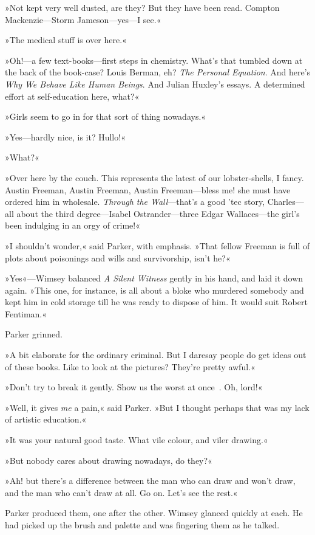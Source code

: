 »Not kept very well dusted, are they? But they have been read. Compton Mackenzie—Storm Jameson—yes—I see.«

»The medical stuff is over here.«

»Oh!—a few text-books—first steps in chemistry. What's that tumbled down at the back of the book-case? Louis Berman, eh? \textit{The Personal Equation}. And here's \textit{Why We Behave Like Human Beings}. And Julian Huxley's essays. A determined effort at self-education here, what?«

»Girls seem to go in for that sort of thing nowadays.«

»Yes—hardly nice, is it? Hullo!«

»What?«

»Over here by the couch. This represents the latest of our lobster-shells, I fancy. Austin Freeman, Austin Freeman, Austin Freeman—bless me! she must have ordered him in wholesale. \textit{Through the Wall}—that's a good 'tec story, Charles—all about the third degree—Isabel Ostrander—three Edgar Wallaces—the girl's been indulging in an orgy of crime!«

»I shouldn't wonder,« said Parker, with emphasis. »That fellow Freeman is full of plots about poisonings and wills and survivorship, isn't he?«

»Yes«—Wimsey balanced \textit{A Silent Witness} gently in his hand, and laid it down again. »This one, for instance, is all about a bloke who murdered somebody and kept him in cold storage till he was ready to dispose of him. It would suit Robert Fentiman.«

Parker grinned.

»A bit elaborate for the ordinary criminal. But I daresay people do get ideas out of these books. Like to look at the pictures? They're pretty awful.«

»Don't try to break it gently. Show us the worst at once\textellipsis~. Oh, lord!«

»Well, it gives \textit{me} a pain,« said Parker. »But I thought perhaps that was my lack of artistic education.«

»It was your natural good taste. What vile colour, and viler drawing.«

»But nobody cares about drawing nowadays, do they?«

»Ah! but there's a difference between the man who can draw and won't draw, and the man who can't draw at all. Go on. Let's see the rest.«

Parker produced them, one after the other. Wimsey glanced quickly at each. He had picked up the brush and palette and was fingering them as he talked.

